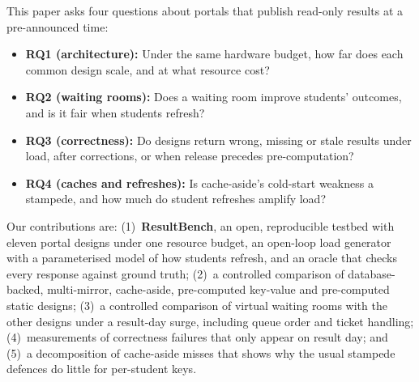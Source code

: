 This paper asks four questions about portals that publish read-only results at
a pre-announced time:
\begin{itemize}
\item \textbf{RQ1 (architecture):} Under the same hardware budget, how far does each common design scale, and at what resource cost?
\item \textbf{RQ2 (waiting rooms):} Does a waiting room improve students' outcomes, and is it fair when students refresh?
\item \textbf{RQ3 (correctness):} Do designs return wrong, missing or stale results under load, after corrections, or when release precedes pre-computation?
\item \textbf{RQ4 (caches and refreshes):} Is cache-aside's cold-start weakness a stampede, and how much do student refreshes amplify load?
\end{itemize}

Our contributions are:
(1)~\textbf{ResultBench}, an open, reproducible testbed with eleven portal
designs under one resource budget, an open-loop load generator with a
parameterised model of how students refresh, and an oracle that checks every
response against ground truth;
(2)~a controlled comparison of database-backed, multi-mirror, cache-aside,
pre-computed key-value and pre-computed static designs;
(3)~a controlled comparison of virtual waiting rooms with the other designs
under a result-day surge, including queue order and ticket handling;
(4)~measurements of correctness failures that only appear on result day;
and (5)~a decomposition of cache-aside misses that shows why the usual
stampede defences do little for per-student keys.
